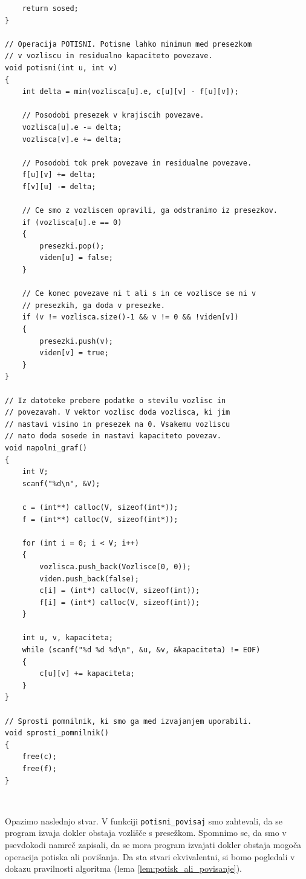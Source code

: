 \documentclass[mat1]{fmfdelo}
\begin{document}
\begin{verbatim}
    return sosed;
}

// Operacija POTISNI. Potisne lahko minimum med presezkom
// v vozliscu in residualno kapaciteto povezave.
void potisni(int u, int v)
{
    int delta = min(vozlisca[u].e, c[u][v] - f[u][v]);

    // Posodobi presezek v krajiscih povezave.
    vozlisca[u].e -= delta;
    vozlisca[v].e += delta;

    // Posodobi tok prek povezave in residualne povezave.
    f[u][v] += delta;
    f[v][u] -= delta;

    // Ce smo z vozliscem opravili, ga odstranimo iz presezkov.
    if (vozlisca[u].e == 0)
    {
        presezki.pop();
        viden[u] = false;
    }

    // Ce konec povezave ni t ali s in ce vozlisce se ni v
    // presezkih, ga doda v presezke.
    if (v != vozlisca.size()-1 && v != 0 && !viden[v])
    {
        presezki.push(v);
        viden[v] = true;
    }
}

// Iz datoteke prebere podatke o stevilu vozlisc in
// povezavah. V vektor vozlisc doda vozlisca, ki jim
// nastavi visino in presezek na 0. Vsakemu vozliscu
// nato doda sosede in nastavi kapaciteto povezav.
void napolni_graf()
{
    int V;
    scanf("%d\n", &V);

    c = (int**) calloc(V, sizeof(int*));
    f = (int**) calloc(V, sizeof(int*));

    for (int i = 0; i < V; i++)
    {
        vozlisca.push_back(Vozlisce(0, 0));
        viden.push_back(false);
        c[i] = (int*) calloc(V, sizeof(int));
        f[i] = (int*) calloc(V, sizeof(int));
    }

    int u, v, kapaciteta;
    while (scanf("%d %d %d\n", &u, &v, &kapaciteta) != EOF)
    {
        c[u][v] += kapaciteta;
    }
}

// Sprosti pomnilnik, ki smo ga med izvajanjem uporabili.
void sprosti_pomnilnik()
{
    free(c);
    free(f);
}

\end{verbatim}~


Opazimo naslednjo stvar. V funkciji \texttt{potisni\_povisaj} smo zahtevali, da se pro\-gram izvaja dokler obstaja vozlišče s presežkom. Spomnimo se, da smo v psevdokodi namreč zapisali, da se mora program izvajati dokler obstaja mogoča operacija potiska ali povišanja. Da sta stvari ekvivalentni, si bomo pogledali v dokazu pravilnosti algoritma (lema \ref{lem:potisk_ali_povisanje}).
\end{document}
